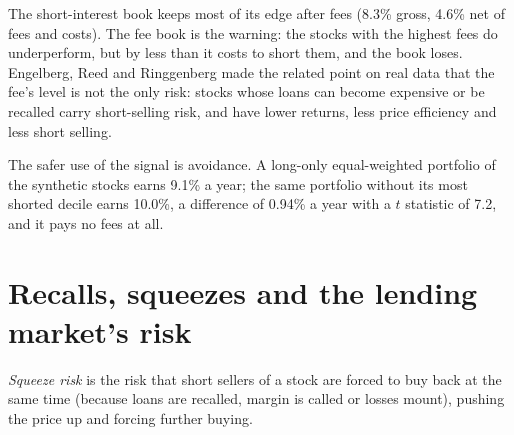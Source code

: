 The short-interest book keeps most of its edge after fees (8.3\% gross, 4.6\% net of fees and costs). The fee book is the warning: the stocks with the
highest fees do underperform, but by less than it costs to short them, and the book loses. Engelberg, Reed and Ringgenberg made the related point on real data
that the fee's level is not the only risk: stocks whose loans can become expensive or be recalled carry short-selling risk, and have lower returns, less
price efficiency and less short selling.

\begin{omfigure}

\label{fig:s1:short-interest-borrow-and-crowding:book}
\end{omfigure}

The safer use of the signal is avoidance. A long-only equal-weighted portfolio of the synthetic stocks earns 9.1\% a year; the same portfolio without its most
shorted decile earns 10.0\%, a difference of 0.94\% a year with a $t$ statistic of 7.2, and it pays no fees at all.

\section{Recalls, squeezes and the lending market's risk}

\begin{definition}\label{def:s1:short-interest-borrow-and-crowding:squeeze}
\emph{Squeeze risk} is the risk that short sellers of a stock are forced to buy back at the same time (because loans are recalled,
margin is called or losses mount), pushing the price up and forcing further buying.
\end{definition}

